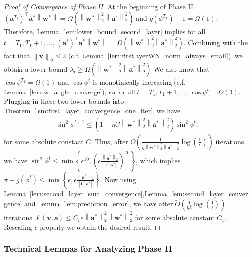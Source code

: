 \documentclass{article}
\newcommand{\firstlayer}{w}
\newcommand{\firstlayerWN}{v}
\newcommand{\secondlayer}{a}
\newcommand{\vect}[1]{\mathbf{#1}}
\newcommand{\norm}[1]{\left\|#1\right\|}
\newcommand{\abs}[1]{\left|#1\right|}
\begin{document}
\begin{proof}[Proof of Convergence of Phase II]
At the beginning of Phase II,  $\left(\vect{\secondlayer}^{T_1}\right)^\top \vect{\secondlayer}^*\norm{\vect{\firstlayer}^*} = \Omega\left(\norm{\vect{\firstlayer}^*}_2^2\norm{\vect{\secondlayer}^*}_2^2\right)$ and $g(\phi^{T_1}) - 1 = \Omega\left(1\right)$.
Therefore, Lemma~\ref{lem:lower_bound_second_layer} implies for all $t=T_1,T_1+1,\ldots$, $\left(\vect{\secondlayer}^{t}\right)^\top \vect{\secondlayer}^*\norm{\vect{\firstlayer}^*} = \Omega\left(\norm{\vect{\firstlayer}^*}_2^2\norm{\vect{\secondlayer}^*}_2^2\right)$.
Combining with the fact that $\norm{\vect{\firstlayerWN}}_2 \le 2$ (c.f. Lemma~\ref{lem:firstlayerWN_norm_always_small}), we obtain a lower bound $\lambda_t \ge \Omega\left(\norm{\vect{\firstlayer}^*}_2^2\norm{\vect{\secondlayer}^*}_2^2\right)$
We also know that 
$\cos \phi^{T_1} = \Omega\left(1\right)$ and $\cos\phi^t$ is monotinically increasing (c.f. Lemma~\ref{lem:w_angle_converge}), so for all $t=T_1,T_1+1,\ldots$, $\cos\phi^t = \Omega\left(1\right)$.
Plugging in these two lower bounds into Theorem~\ref{lem:first_layer_convergence_one_iter}, we have \begin{align*}
\sin^2\phi^{t+1}  \le \left(1-\eta C\norm{\vect{\firstlayer}^*}_2^2\norm{\vect{\secondlayer}^*}_2^2\right)\sin^2\phi^t.
\end{align*} for some absolute constant $C$.
Thus, after $O\left(\frac{1}{\eta\norm{\vect{\firstlayer}^*}_2^2\norm{\vect{\secondlayer}^*}_2^2}\log\left(\frac{1}{\epsilon}\right)\right)$ iterations, we have $\sin^2\phi^t \le \min\left\{\epsilon^{10},\left(\epsilon\frac{\norm{\vect{\secondlayer}^*}_2}{\abs{\vect{1}^\top \vect{\secondlayer}^*}}\right)^{10}\right\}$, which implies $\pi- g(\phi^t) \le \min\left\{\epsilon,\epsilon\frac{\norm{\vect{\secondlayer}^*}_2}{\abs{\vect{1}^\top \vect{\secondlayer}^*}} \right\}$.
Now using Lemma~\ref{lem:second_layer_sum_convergence},Lemma~\ref{lem:second_layer_convergence} and Lemma~\ref{lem:prediction_error}, we have after $\widetilde{O}\left(
\frac{1}{\eta k}\log\left(\frac{1}{\epsilon}\right)
\right)$ iterations $\ell\left(\vect{\firstlayerWN},\vect{\secondlayer}\right) \le C_1\epsilon \norm{\vect{\secondlayer}^*}_2^2\norm{\vect{\firstlayer}^*}_2^2$ for some absolute constant $C_1$.
Rescaling $\epsilon$ properly we obtain the desired result.
\end{proof}\subsubsection{Technical Lemmas for Analyzing Phase II}\label{lem:}
\end{document}
